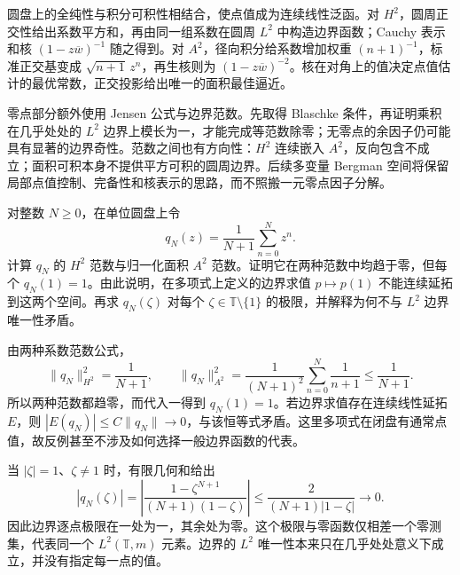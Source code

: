 





\begin{chaptersummary}
圆盘上的全纯性与积分可积性相结合，使点值成为连续线性泛函。对 \(H^2\)，圆周正交性给出系数平方和，再由同一组系数在圆周 \(L^2\) 中构造边界函数；Cauchy 表示和核 \((1-z\overline w)^{-1}\) 随之得到。对 \(A^2\)，径向积分给系数增加权重 \((n+1)^{-1}\)，标准正交基变成 \(\sqrt{n+1}\,z^n\)，再生核则为 \((1-z\overline w)^{-2}\)。核在对角上的值决定点值估计的最优常数，正交投影给出唯一的面积最佳逼近。

零点部分额外使用 Jensen 公式与边界范数。先取得 Blaschke 条件，再证明乘积在几乎处处的 \(L^2\) 边界上模长为一，才能完成等范数除零；无零点的余因子仍可能具有显著的边界奇性。范数之间也有方向性：\(H^2\) 连续嵌入 \(A^2\)，反向包含不成立；面积可积本身不提供平方可积的圆周边界。后续多变量 Bergman 空间将保留局部点值控制、完备性和核表示的思路，而不照搬一元零点因子分解。
\end{chaptersummary}

\BookExercises


\begin{exercise}\label{b3:ex:28-1}
对整数 \(N\ge0\)，在单位圆盘上令
\[
 q_N(z)=\frac1{N+1}\sum_{n=0}^N z^n.
\]
计算 \(q_N\) 的 \(H^2\) 范数与归一化面积 \(A^2\) 范数。证明它在两种范数中均趋于零，但每个 \(q_N(1)=1\)。由此说明，在多项式上定义的边界求值 \(p\mapsto p(1)\) 不能连续延拓到这两个空间。再求 \(q_N(\zeta)\) 对每个 \(\zeta\in\mathbb T\setminus\{1\}\) 的极限，并解释为何不与 \(L^2\) 边界唯一性矛盾。
\end{exercise}
\begin{solution}
由两种系数范数公式，
\[
 \|q_N\|_{H^2}^2=\frac1{N+1},\qquad
 \|q_N\|_{A^2}^2=\frac1{(N+1)^2}\sum_{n=0}^N\frac1{n+1}
 \le\frac1{N+1}.
\]
所以两种范数都趋零，而代入一得到 \(q_N(1)=1\)。若边界求值存在连续线性延拓 \(E\)，则 \(|E(q_N)|\le C\|q_N\|\to0\)，与该恒等式矛盾。这里多项式在闭盘有通常点值，故反例甚至不涉及如何选择一般边界函数的代表。

当 \(|\zeta|=1\)、\(\zeta\ne1\) 时，有限几何和给出
\[
 |q_N(\zeta)|=\left|\frac{1-\zeta^{N+1}}{(N+1)(1-\zeta)}\right|
 \le\frac2{(N+1)|1-\zeta|}\longrightarrow0.
\]
因此边界逐点极限在一处为一，其余处为零。这个极限与零函数仅相差一个零测集，代表同一个 \(L^2(\mathbb T,m)\) 元素。边界的 \(L^2\) 唯一性本来只在几乎处处意义下成立，并没有指定每一点的值。
\end{solution}

